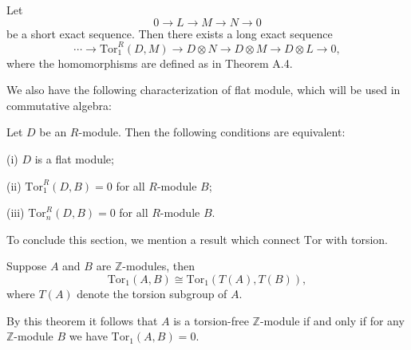 \begin{theorem}
Let 
$$
0\longrightarrow L\longrightarrow M\longrightarrow N\longrightarrow 0
$$
be a short exact sequence. Then there exists a long exact sequence 
$$
\cdots \longrightarrow \mathrm{Tor}_{1}^{R}\left( D,M \right) \longrightarrow D\otimes N\longrightarrow D\otimes M\longrightarrow D\otimes L\longrightarrow 0,
$$
where the homomorphisms are defined as in Theorem A.4.
\end{theorem}
We also have the following characterization of flat module, which will be used in commutative algebra:
\begin{theorem}
Let $D$ be an $R$-module. Then the following conditions are equivalent:\par
(i) $D$ is a flat module;\par
(ii) $\mathrm{Tor}_1^R(D,B)=0$ for all $R$-module $B$;\par
(iii) $\mathrm{Tor}_n^R(D,B)=0$ for all $R$-module $B$.
\end{theorem}
To conclude this section, we mention a result which connect $\mathrm{Tor}$ with torsion.
\begin{theorem}
Suppose $A$ and $B$ are $\mathbb{Z}$-modules, then 
$$\mathrm{Tor}_1(A,B)\cong\mathrm{Tor}_1(T(A),T(B)),$$
where $T(A)$ denote the torsion subgroup of $A$.
\end{theorem}
By this theorem it follows that $A$ is a torsion-free $\mathbb{Z}$-module if and only if for any $\mathbb{Z}$-module $B$ we have $\mathrm{Tor}_1(A,B)=0$.